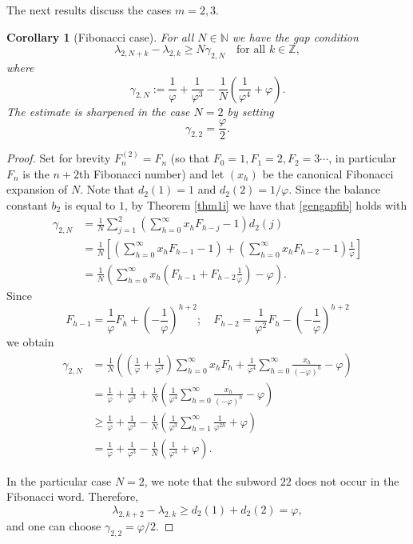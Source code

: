 \documentclass{amsart}
\newtheorem{corollary}[theorem]{Corollary}
\newcommand{\NN}{\mathbb N}
\newcommand{\ZZ}{\mathbb Z}
\begin{document}


The next results discuss the cases $m=2,3$. 


\begin{corollary}[Fibonacci case]\label{cor1}
For all $N\in \NN$ we have the gap condition
\begin{equation}\label{gengapfib}
\lambda_{2,N+k}-\lambda_{2,k}\geq N\gamma_{2,N} \quad \text{for all } k\in \ZZ,
\end{equation}
where
$$\gamma_{2,N}:=\frac{1}{\varphi}+\frac{1}{\varphi^3} -\frac{1}{N}\left(\frac{1}{\varphi^4}+\varphi\right).$$
The estimate is sharpened in the case $N=2$ by setting  $$\gamma_{2,2}=\frac{\varphi}{2}.$$

\end{corollary}
\begin{proof}
Set for brevity $F^{(2)}_n=F_n$ (so that $F_0=1, F_1=2,F_2=3\cdots$, in particular $F_n$ is the $n+2$th Fibonacci number) and let $(x_h)$ be the canonical Fibonacci expansion of $N$. Note that $d_2(1)=1$ and $d_2(2)=1/\varphi$. Since the balance constant $b_2$ is equal to $1$, by Theorem \ref{thm1i} we have that 
\eqref{gengapfib} holds with 
\begin{align*}\gamma_{2,N}
&=
\frac{1}{N}
\sum_{j=1}^2
\left(
\sum_{h=0}^\infty x_h F_{h-j} - 1
\right)d_2(j)\\
&=
\frac{1}{N}
\left[
\left(\sum_{h=0}^\infty x_h F_{h-1} -1\right)
+
\left(\sum_{h=0}^\infty x_h F_{h-2} -1\right)\frac{1}{\varphi}
\right] \\
&=
\frac{1}{N}
\left(
\sum_{h=0}^\infty x_h\left(F_{h-1}+F_{h-2}\frac{1}{\varphi}\right)
-\varphi
\right).
\end{align*}
Since 
$$F_{h-1}=\frac{1}{\varphi} F_h +  \left(-\frac{1}{\varphi}\right)^{h+2};\quad F_{h-2}=\frac{1}{\varphi^2} F_h -  \left(-\frac{1}{\varphi}\right)^{h+2} $$
we obtain
\begin{align*}\gamma_{2,N}&=\frac{1}{ N}\left(\left(\frac{1}{\varphi}+\frac{1}{\varphi^3}\right) \sum_{h=0}^\infty x_h F_h+ \frac{1}{\varphi^4}\sum_{h=0}^\infty  \frac{x_h}{(-\varphi)^h}-\varphi\right)\\
&=\frac{1}{\varphi}+\frac{1}{\varphi^3} +\frac{1}{ N}\left(\frac{1}{\varphi^4}\sum_{h=0}^\infty \frac{x_h}{(-\varphi)^h}-\varphi\right)\\
&\geq\frac{1}{\varphi}+\frac{1}{\varphi^3}  -\frac{1}{ N}\left(\frac{1}{\varphi^3}\sum_{h=1}^\infty \frac{1}{\varphi^{2h}}+\varphi\right)\\
&= \frac{1}{\varphi}+\frac{1}{\varphi^3} -\frac{1}{N}\left(\frac{1}{\varphi^4}+\varphi\right).
\end{align*}


In the particular case $N=2$, we note that the subword $22$ does not occur
in the Fibonacci word.
Therefore,
\[
\lambda_{2,k+2}-\lambda_{2,k}\ge d_2(1)+d_2(2)=\varphi,
\]
and one can choose $\gamma_{2,2}=\varphi/2$.


\end{proof}
\end{document}
